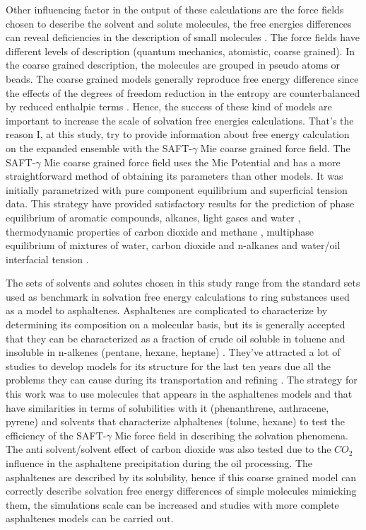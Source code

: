 Other influencing factor in the output of these calculations are the force fields chosen to describe the solvent and solute molecules, the free energies differences  can reveal deficiencies in the description of small molecules \cite{mobley2007,shirts2013}. The force fields have different levels of description (quantum mechanics, atomistic, coarse grained). In the coarse grained description, the molecules are grouped in pseudo atoms or beads. The coarse grained models generally reproduce free energy difference since the effects of the degrees of freedom reduction  in the entropy are counterbalanced by reduced enthalpic terms \cite{kmiecik2016}. Hence, the success of these kind of models are important to  increase the scale of solvation free energies calculations. That's the reason I, at this study, try to provide information about free energy calculation on the expanded ensemble with the SAFT-$\gamma$ Mie coarse grained force field. The SAFT-$\gamma$ Mie coarse grained force field uses the Mie Potential \cite{MIE} and has a more straightforward method of obtaining its parameters than other models. It was initially parametrized with pure component equilibrium and superficial tension data. This strategy have provided satisfactory results for the prediction of phase equilibrium of aromatic compounds, alkanes, light gases and water \cite{herdes2015,muller2017,lobanova2015} , thermodynamic properties of carbon dioxide and methane \cite{cassiano1}, multiphase equilibrium of mixtures of water, carbon dioxide and n-alkanes \cite{lobanova2016} and water/oil interfacial tension \cite{herdes2017}.  

The sets of solvents and solutes chosen in this study range from the standard sets used as benchmark in solvation free energy calculations to ring substances used as a model to asphaltenes. Asphaltenes are complicated to characterize by determining its composition on a molecular basis, but its is generally accepted that they can be characterized as a fraction of crude oil soluble in toluene and insoluble in n-alkenes (pentane, hexane, heptane) \cite{SJOBLOM2003399}. They've attracted a  lot of studies to develop models for its structure for the last ten years  due all the problems they can cause during its transportation and refining \cite{SJOBLOM20151}. The strategy for this work was to use molecules that appears in the asphaltenes models and that have similarities in terms of solubilities with it (phenanthrene, anthracene, pyrene) and solvents that characterize alphaltenes (tolune, hexane) to test the efficiency of the SAFT-$\gamma$ Mie force field in describing the solvation phenomena. The anti solvent/solvent effect of carbon dioxide was also tested due to the $CO_{2}$ influence in the asphaltene precipitation during the oil processing. The asphaltenes are described by its solubility, hence if this coarse grained model can correctly describe solvation free energy differences of simple molecules mimicking them, the simulations scale can be increased and studies with more complete asphaltenes models can be carried out.

